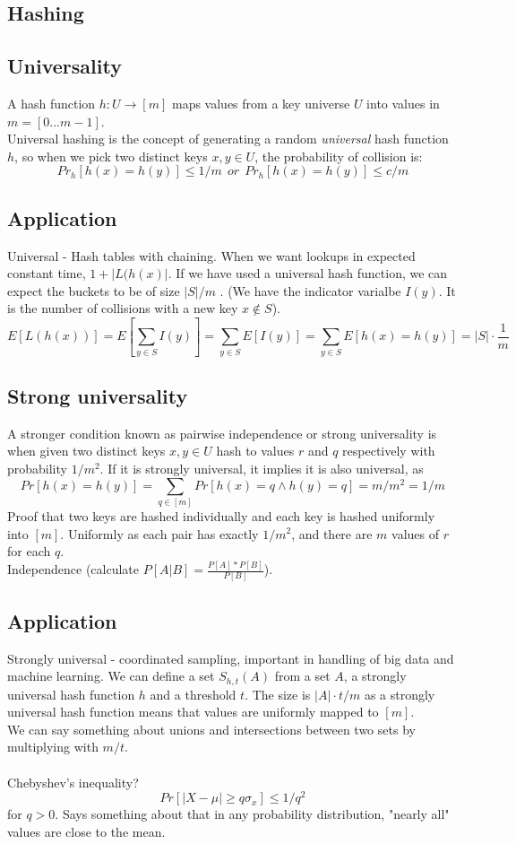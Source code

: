\documentclass[a4paper]{article}
\author{Nikolaj Dybdahl Rathcke (rfq695)}
\begin{document}
\begin{center}
\section*{Hashing}
\end{center}
\subsection*{Universality}
A hash function $h: U\rightarrow [m]$ maps values from a key universe $U$ into values in $m=[0...m-1]$. \\
Universal hashing is the concept of generating a random \textit{universal} hash function $h$, so when we pick two distinct keys $x,y\in U$, the probability of collision is:
$$Pr_h[h(x)=h(y)]\leq 1/m\ \ or\ \ Pr_h[h(x)=h(y)]\leq c/m$$

\subsection*{Application}
Universal - Hash tables with chaining. When we want lookups in expected constant time, $1+|L(h(x)|$. If we have used a universal hash function, we can expect the buckets to be of size $|S|/m$ . (We have the indicator varialbe $I(y)$. It is the number of collisions with a new key $x\not\in S$).
$$E[L(h(x))]=E[\sum_{y\in S}I(y)]=\sum_{y\in S}E[I(y)]=\sum_{y\in S}E[h(x)=h(y)]=|S|\cdot \frac{1}{m}$$

\subsection*{Strong universality}
A stronger condition known as pairwise independence or strong universality is when given two distinct keys $x,y\in U$ hash to values $r$ and $q$ respectively with probability $1/m^2$. If it is strongly universal, it implies it is also universal, as
$$Pr[h(x)=h(y)]=\sum_{q\in [m]}Pr[h(x)=q\land h(y)=q]=m/m^2=1/m$$
Proof that two keys are hashed individually and each key is hashed uniformly into $[m]$. Uniformly as each pair has exactly $1/m^2$, and there are $m$ values of $r$ for each $q$. \\
Independence (calculate $P[A|B]=\frac{P[A]*P[B]}{P[B]}$).

\subsection*{Application}
Strongly universal - coordinated sampling, important in handling of big data and machine learning. We can define a set $S_{h,t}(A)$ from a set $A$, a strongly universal hash function $h$ and a threshold $t$. The size is $|A|\cdot t/m$ as a strongly universal hash function means that values are uniformly mapped to $[m]$. \\
We can say something about unions and intersections between two sets by multiplying with $m/t$. \\
\\
Chebyshev's inequality?
$$Pr[|X-\mu | \geq q\sigma_x]\leq 1/q^2$$
for $q>0$. Says something about that in any probability distribution, "nearly all" values are close to the mean.
\end{document}
